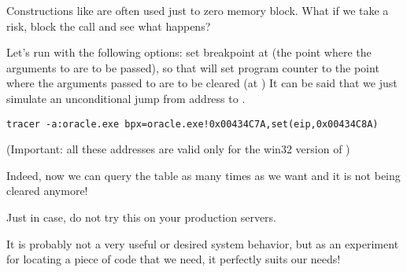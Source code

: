 Constructions like  are often used just to zero memory block.
What if we take a risk, block the  call and see what happens?


Let's run \tracer with the following options: set breakpoint at  
(the point where the arguments to  are to be passed), 
so that \tracer will set program counter  to the point where the arguments passed to  are to be cleared (at )
It can be said that we just simulate an unconditional jump from address  to .

\begin{lstlisting}
tracer -a:oracle.exe bpx=oracle.exe!0x00434C7A,set(eip,0x00434C8A)
\end{lstlisting}

(Important: all these addresses are valid only for the win32 version of )

Indeed, now we can query the  table as many times as we want and it is not being cleared anymore!

Just in case, do not try this on your production servers.

It is probably not a very useful or desired system behavior, but as an experiment for locating a piece of code that we need, it perfectly suits our needs!

